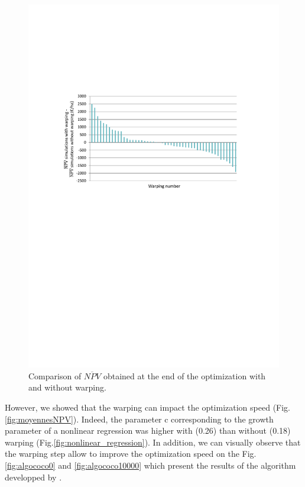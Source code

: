 	\begin{figure}[!ht]
		\centering
		\includegraphics[trim = 2.6cm 13.5cm 3.1cm 6.8cm, clip, width=\textwidth]{Figures_Warping_resultats_warping_moins_sanswarping.pdf}
		\caption{Comparison of $\overline{NPV}$ obtained at the end of the optimization with and without warping. }\label{fig:waping_moins_sanswarping}
	\end{figure}
	
	However, we showed that the warping can impact the optimization speed (Fig.\ref{fig:moyennesNPV}). 
	Indeed, the parameter c corresponding to the growth parameter of a nonlinear regression was higher with (0.26) than without (0.18) warping (Fig.\ref{fig:nonlinear_regression}). 
	In addition, we can visually observe that the warping step allow to improve the optimization speed on the Fig.\ref{fig:algococo0} and \ref{fig:algococo10000} 
	which present the results of the algorithm developped by .
	
